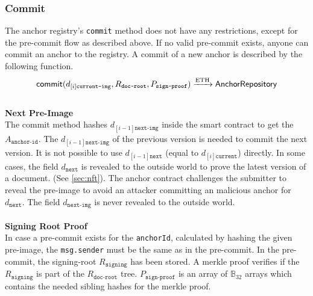 \subsubsection{Commit}
The anchor registry's \texttt{commit} method does not have any restrictions, except for the pre-commit flow as described above. If no valid pre-commit exists, anyone can commit an anchor to the registry. A commit of a new anchor is described by the following function. 
\begin{equation}\\
    \mathsf{commit}(d_{[i]\texttt{current-img}},R_{\texttt{doc-root}},P_{\texttt{sign-proof}}) \xrightarrow[]{\text{ETH}} \mathsf{AnchorRepository}
\end{equation}\\
\textbf{Next Pre-Image }\\
The commit method hashes $d_{[i−1]\texttt{next-img}}$ inside the smart contract to get the $A_{\texttt{anchor-id}}$. The $d_{[i−1]\texttt{next-img}}$ of the previous version is needed to commit the next version. It is not possible to use $d_{[i−1]\texttt{next}}$ (equal to $d_{[i]\texttt{current}}$) directly. In some cases, the field  $d_{\texttt{next}}$ is revealed to the outside world to prove the latest version of a document. (See \ref{sec:nft}). The anchor contract challenges the submitter to reveal the pre-image to avoid an attacker committing an malicious anchor for $d_{\texttt{next}}$. The field $d_{\texttt{next-img}}$ is never revealed to the outside world. \\
\\
\textbf{Signing Root Proof }\\
In case a pre-commit exists for the \texttt{anchorId}, calculated by hashing the given pre-image, the \texttt{msg.sender} must be the same as in the pre-commit. In the pre-commit, the signing-root $R_{\texttt{signing}}$ has been stored. A merkle proof verifies if the $R_{\texttt{signing}}$ is part of the $R_{\texttt{doc-root}}$ tree. $P_{\texttt{sign-proof}}$ is an array of $\mathbb{B}_{32}$ arrays which contains the needed sibling hashes for the merkle proof. 






